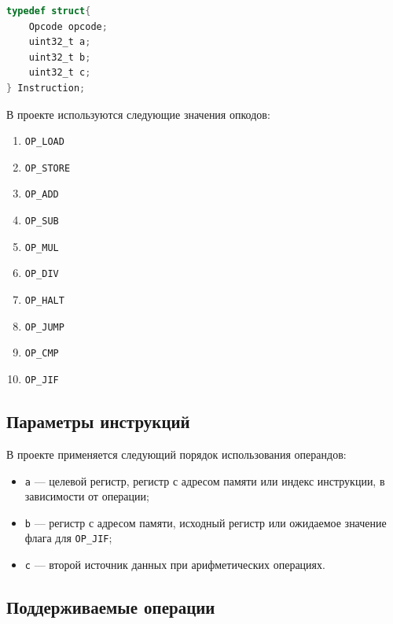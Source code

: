 \documentclass[12pt,a4paper]{article}
\begin{document}
\begin{lstlisting}[language=C]
typedef struct{
    Opcode opcode;
    uint32_t a;
    uint32_t b;
    uint32_t c;
} Instruction;
\end{lstlisting}

В проекте используются следующие значения опкодов:

\begin{enumerate}[leftmargin=2em]
    \item \texttt{OP\_LOAD}
    \item \texttt{OP\_STORE}
    \item \texttt{OP\_ADD}
    \item \texttt{OP\_SUB}
    \item \texttt{OP\_MUL}
    \item \texttt{OP\_DIV}
    \item \texttt{OP\_HALT}
    \item \texttt{OP\_JUMP}
    \item \texttt{OP\_CMP}
    \item \texttt{OP\_JIF}
\end{enumerate}

\subsection{Параметры инструкций}

В проекте применяется следующий порядок использования операндов:

\begin{itemize}[leftmargin=1.5em]
    \item \texttt{a} --- целевой регистр, регистр с адресом памяти или индекс инструкции, в зависимости от операции;
    \item \texttt{b} --- регистр с адресом памяти, исходный регистр или ожидаемое значение флага для \texttt{OP\_JIF};
    \item \texttt{c} --- второй источник данных при арифметических операциях.
\end{itemize}

\subsection{Поддерживаемые операции}
\end{document}
